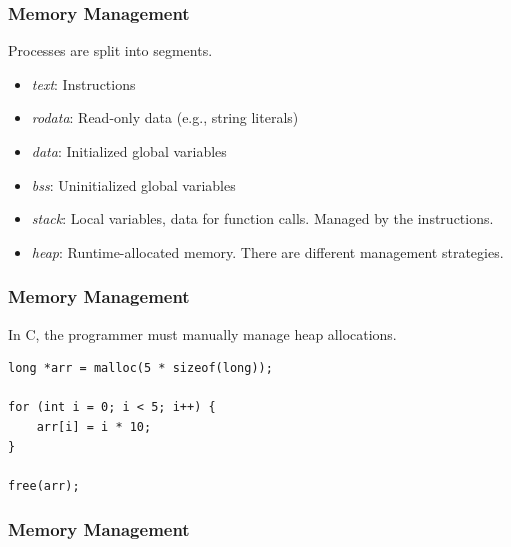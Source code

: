 \begin{frame}[fragile]
    \frametitle{Memory Management}
    Processes are split into segments.
    \vfill
    \begin{itemize}
        \item \textit{text}: Instructions
        \item \textit{rodata}: Read-only data (e.g., string literals)
        \item \textit{data}: Initialized global variables
        \item \textit{bss}: Uninitialized global variables
        \pause
        \vspace{.3cm}
        \item \textit{stack}: Local variables, data for function calls. Managed by the instructions.
        \pause
        \vspace{.3cm}
        \item \textit{heap}: Runtime-allocated memory. There are different management strategies.
    \end{itemize}
\end{frame}

\begin{frame}[fragile]
    \frametitle{Memory Management}
    In C, the programmer must manually manage heap allocations.
    \pause
    \vfill
    \begin{verbatim}
long *arr = malloc(5 * sizeof(long));

for (int i = 0; i < 5; i++) {
    arr[i] = i * 10;
}

free(arr);
    \end{verbatim}
\end{frame}

\begin{frame}[fragile]
    \frametitle{Memory Management}
    \begin{center}
    \end{center}
\end{frame}


